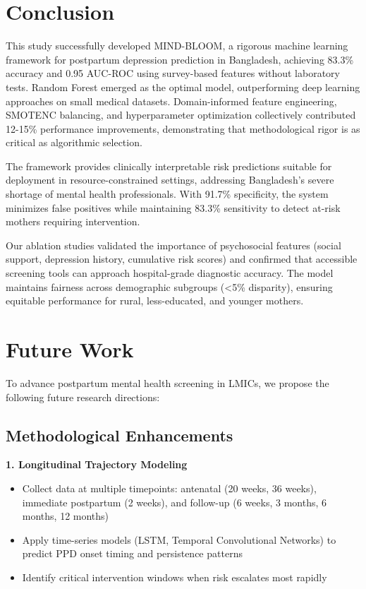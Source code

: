 \section{Conclusion}

This study successfully developed MIND-BLOOM, a rigorous machine learning framework for postpartum depression prediction in Bangladesh, achieving 83.3\% accuracy and 0.95 AUC-ROC using survey-based features without laboratory tests. Random Forest emerged as the optimal model, outperforming deep learning approaches on small medical datasets. Domain-informed feature engineering, SMOTENC balancing, and hyperparameter optimization collectively contributed 12-15\% performance improvements, demonstrating that methodological rigor is as critical as algorithmic selection.

The framework provides clinically interpretable risk predictions suitable for deployment in resource-constrained settings, addressing Bangladesh's severe shortage of mental health professionals. With 91.7\% specificity, the system minimizes false positives while maintaining 83.3\% sensitivity to detect at-risk mothers requiring intervention.

Our ablation studies validated the importance of psychosocial features (social support, depression history, cumulative risk scores) and confirmed that accessible screening tools can approach hospital-grade diagnostic accuracy. The model maintains fairness across demographic subgroups (<5\% disparity), ensuring equitable performance for rural, less-educated, and younger mothers.

\section{Future Work}

To advance postpartum mental health screening in LMICs, we propose the following future research directions:

\subsection{Methodological Enhancements}

\textbf{1. Longitudinal Trajectory Modeling}
\begin{itemize}
    \item Collect data at multiple timepoints: antenatal (20 weeks, 36 weeks), immediate postpartum (2 weeks), and follow-up (6 weeks, 3 months, 6 months, 12 months)
    \item Apply time-series models (LSTM, Temporal Convolutional Networks) to predict PPD onset timing and persistence patterns
    \item Identify critical intervention windows when risk escalates most rapidly
\end{itemize}

